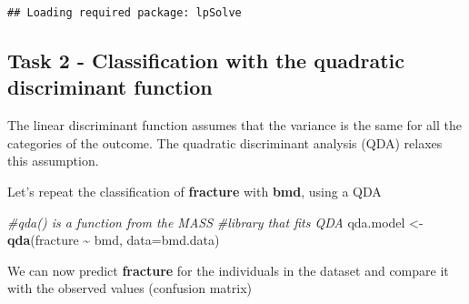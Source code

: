 \documentclass[
]{book}
\newenvironment{Shaded}{\begin{snugshade}}{\end{snugshade}}
\newcommand{\AttributeTok}[1]{\textcolor[rgb]{0.13,0.29,0.53}{#1}}
\newcommand{\CommentTok}[1]{\textcolor[rgb]{0.56,0.35,0.01}{\textit{#1}}}
\newcommand{\FunctionTok}[1]{\textcolor[rgb]{0.13,0.29,0.53}{\textbf{#1}}}
\newcommand{\NormalTok}[1]{#1}
\newcommand{\OtherTok}[1]{\textcolor[rgb]{0.56,0.35,0.01}{#1}}
\newcommand{\SpecialCharTok}[1]{\textcolor[rgb]{0.81,0.36,0.00}{\textbf{#1}}}
\begin{document}
\begin{verbatim}
## Loading required package: lpSolve
\end{verbatim}

\begin{Shaded}
\end{Shaded}

\subsection*{Task 2 - Classification with the quadratic discriminant function}\label{task-2---classification-with-the-quadratic-discriminant-function}

The linear discriminant function assumes that the variance is the
same for all the categories of the outcome. The quadratic discriminant
analysis (QDA) relaxes this assumption.

Let's repeat the classification of \textbf{fracture} with \textbf{bmd}, using a QDA

\begin{Shaded}
\begin{Highlighting}[]
\CommentTok{\#qda() is a function from the MASS}
\CommentTok{\#library that fits QDA}
\NormalTok{qda.model }\OtherTok{\textless{}{-}} \FunctionTok{qda}\NormalTok{(fracture }\SpecialCharTok{\textasciitilde{}}\NormalTok{ bmd, }
                  \AttributeTok{data=}\NormalTok{bmd.data)}
\end{Highlighting}
\end{Shaded}

We can now predict \textbf{fracture} for the individuals in the dataset and compare
it with the observed values (confusion matrix)

\begin{Shaded}
\end{Shaded}
\end{document}
